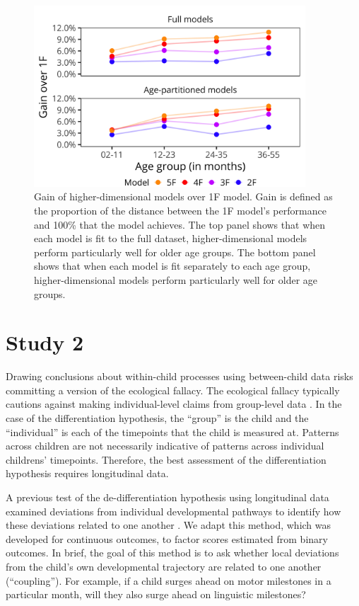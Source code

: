 \documentclass[man, floatsintext]{apa7}
\begin{document}
\begin{figure}[t]
\includegraphics[width=4in]{figures/study1.png}
\caption{Gain of higher-dimensional models over 1F model. Gain is defined as the proportion of the distance between the 1F model’s performance and 100\% that the model achieves. The top panel shows that when each model is fit to the full dataset, higher-dimensional models perform particularly well for older age groups. The bottom panel shows that when each model is fit separately to each age group, higher-dimensional models perform particularly well for older age groups.}
\label{fig:study1}
\end{figure}



\section{Study 2}


Drawing conclusions about within-child processes using between-child
data risks committing a version of the ecological fallacy. The
ecological fallacy typically cautions against making individual-level
claims from group-level data \parencite{piantadosi1988}. In the case of the differentiation
hypothesis, the ``group'' is the child and the ``individual'' is each of
the timepoints that the child is measured at. Patterns across children
are not necessarily indicative of patterns across individual childrens'
timepoints. Therefore, the best assessment of the differentiation
hypothesis requires longitudinal data.


A previous test of the de-differentiation hypothesis using longitudinal data
examined deviations from individual developmental pathways to identify how these deviations related to one another \parencite{hulur2015}. We adapt this
method, which was developed for continuous outcomes, to factor scores
estimated from binary outcomes. In brief, the goal of this method is to ask whether local deviations from the child's own developmental trajectory are related to one another (``coupling''). For example, if a child surges ahead on motor milestones in a particular month, will they also surge ahead on linguistic milestones?
\end{document}
